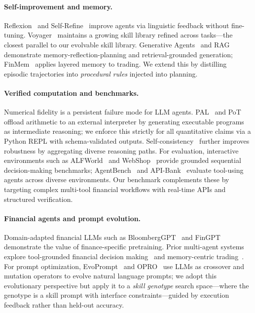 \documentclass{article}
\begin{document}
\paragraph{Self-improvement and memory.}
Reflexion~\citep{shinn2023reflexion} and Self-Refine~\citep{madaan2023selfrefine} improve agents via linguistic feedback without fine-tuning. Voyager~\citep{wang2023voyager} maintains a growing skill library refined across tasks—the closest parallel to our evolvable skill library. Generative Agents~\citep{park2023generativeagents} and RAG~\citep{lewis2020rag} demonstrate memory-reflection-planning and retrieval-grounded generation; FinMem~\citep{finmem2023} applies layered memory to trading. We extend this by distilling episodic trajectories into \emph{procedural rules} injected into planning.

\paragraph{Verified computation and benchmarks.}
Numerical fidelity is a persistent failure mode for LLM agents. PAL~\citep{gao2022pal} and PoT~\citep{chen2022pot} offload arithmetic to an external interpreter by generating executable programs as intermediate reasoning; we enforce this strictly for all quantitative claims via a Python REPL with schema-validated outputs. Self-consistency~\citep{wang2023selfconsistency} further improves robustness by aggregating diverse reasoning paths. For evaluation, interactive environments such as ALFWorld~\citep{shridhar2021alfworld} and WebShop~\citep{yao2022webshop} provide grounded sequential decision-making benchmarks; AgentBench~\citep{liu2023agentbench} and API-Bank~\citep{li2023apibank} evaluate tool-using agents across diverse environments. Our benchmark complements these by targeting complex multi-tool financial workflows with real-time APIs and structured verification.

\paragraph{Financial agents and prompt evolution.}
Domain-adapted financial LLMs such as BloombergGPT~\citep{wu2023bloomberggpt} and FinGPT~\citep{yang2023fingpt} demonstrate the value of finance-specific pretraining. Prior multi-agent systems explore tool-grounded financial decision making~\citep{tradingagents2024,fincon2024} and memory-centric trading~\citep{finmem2023}. For prompt optimization, EvoPrompt~\citep{evoprompt2024} and OPRO~\citep{opro2023} use LLMs as crossover and mutation operators to evolve natural language prompts; we adopt this evolutionary perspective but apply it to a \emph{skill genotype} search space—where the genotype is a skill prompt with interface constraints—guided by execution feedback rather than held-out accuracy.
\end{document}
